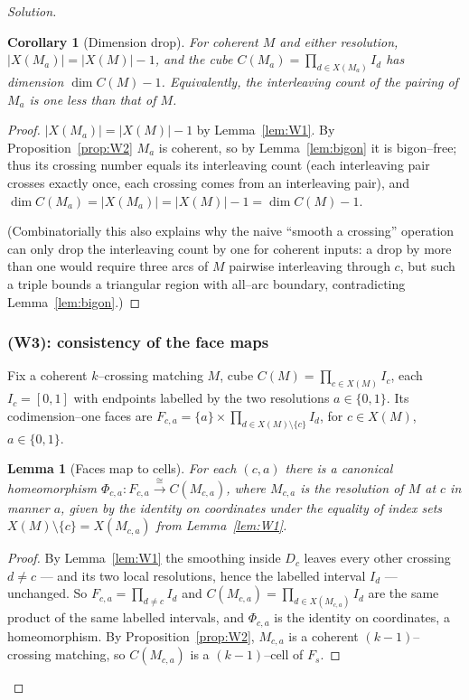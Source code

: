 \documentclass{amsart}
\newtheorem{lemma}{Lemma}
\newtheorem{corollary}{Corollary}
\theoremstyle{definition}
\begin{document}
\begin{proof}[Solution]
\begin{corollary}[Dimension drop]\label{cor:dimdrop}
For coherent $M$ and either resolution, $|X(M_a)|=|X(M)|-1$, and the cube
$C(M_a)=\prod_{d\in X(M_a)}I_d$ has dimension $\dim C(M)-1$. Equivalently, the interleaving count
of the pairing of $M_a$ is one less than that of $M$.
\end{corollary}

\begin{proof}
$|X(M_a)|=|X(M)|-1$ by Lemma~\ref{lem:W1}. By Proposition~\ref{prop:W2} $M_a$ is coherent, so by
Lemma~\ref{lem:bigon} it is bigon–free; thus its crossing number equals its interleaving count
(each interleaving pair crosses exactly once, each crossing comes from an interleaving pair), and
$\dim C(M_a)=|X(M_a)|=|X(M)|-1=\dim C(M)-1$.

(Combinatorially this also explains why the naive ``smooth a crossing'' operation can only drop
the interleaving count by one for coherent inputs: a drop by more than one would require three
arcs of $M$ pairwise interleaving through $c$, but such a triple bounds a triangular region with
all–arc boundary, contradicting Lemma~\ref{lem:bigon}.)
\end{proof}

\subsubsection{(W3): consistency of the face maps}\label{ssec:W3}

Fix a coherent $k$–crossing matching $M$, cube $C(M)=\prod_{c\in X(M)}I_c$, each $I_c=[0,1]$ with
endpoints labelled by the two resolutions $a\in\{0,1\}$. Its codimension–one faces are
$F_{c,a}=\{a\}\times\prod_{d\in X(M)\setminus\{c\}}I_d$, for $c\in X(M)$, $a\in\{0,1\}$.

\begin{lemma}[Faces map to cells]\label{lem:facemap}
For each $(c,a)$ there is a canonical homeomorphism
$\Phi_{c,a}\colon F_{c,a}\xrightarrow{\cong}C(M_{c,a})$, where $M_{c,a}$ is the resolution of $M$
at $c$ in manner $a$, given by the identity on coordinates under the equality of index sets
$X(M)\setminus\{c\}=X(M_{c,a})$ from Lemma~\ref{lem:W1}.
\end{lemma}

\begin{proof}
By Lemma~\ref{lem:W1} the smoothing inside $D_c$ leaves every other crossing $d\neq c$ — and its
two local resolutions, hence the labelled interval $I_d$ — unchanged. So
$F_{c,a}=\prod_{d\neq c}I_d$ and $C(M_{c,a})=\prod_{d\in X(M_{c,a})}I_d$ are the same product of
the same labelled intervals, and $\Phi_{c,a}$ is the identity on coordinates, a homeomorphism. By
Proposition~\ref{prop:W2}, $M_{c,a}$ is a coherent $(k-1)$–crossing matching, so $C(M_{c,a})$ is
a $(k-1)$–cell of $F_s$.
\end{proof}


\end{proof}
\end{document}
